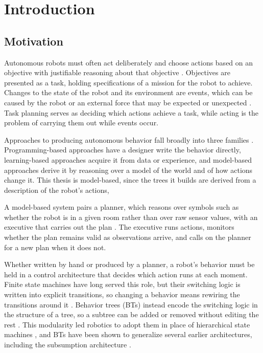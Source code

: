 \chapter{Introduction}
\label{ch:intro}
\section{Motivation}
\label{sec:motivation}
    Autonomous robots must often act deliberately and choose actions based on an objective with justifiable reasoning about that objective \cite{ingrand2017}.
    Objectives are presented as a task, holding specifications of a mission for the robot to achieve.
    Changes to the state of the robot and its environment are events, which can be caused by the robot or an external force that may be expected or unexpected \cite{ingrand2017}.
    Task planning serves as deciding which actions achieve a task, while acting is the problem of carrying them out while events occur.

    Approaches to producing autonomous behavior fall broadly into three families \cite{karpas2020}.
    Programming-based approaches have a designer write the behavior directly, learning-based approaches acquire it from data or experience, and model-based approaches derive it by reasoning over a model of the world and of how actions change it.
    This thesis is model-based, since the trees it builds are derived from a description of the robot’s actions,

    A model-based system pairs a planner, which reasons over symbols such as whether the robot is in a given room rather than over raw sensor values, with an executive that carries out the plan \cite{karpas2020}.
    The executive runs actions, monitors whether the plan remains valid as observations arrive, and calls on the planner for a new plan when it does not.

    Whether written by hand or produced by a planner, a robot's behavior must be held in a control architecture that decides which action runs at each moment.
    Finite state machines have long served this role, but their switching logic is written into explicit transitions, so changing a behavior means rewiring the transitions around it \cite{colledanchise2018book}.
    Behavior trees (BTs) instead encode the switching logic in the structure of a tree, so a subtree can be added or removed without editing the rest \cite{ogren2012}.
    This modularity led robotics to adopt them in place of hierarchical state machines \cite{bagnell2012}, and BTs have been shown to generalize several earlier architectures, including the subsumption architecture \cite{colledanchise2017tro}.

